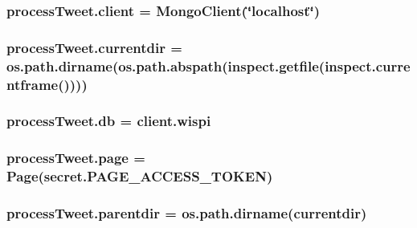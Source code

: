 \subsubsection[{client}]{\setlength{\rightskip}{0pt plus 5cm}process\+Tweet.\+client = Mongo\+Client(\char`\"{}localhost\char`\"{})}\label{namespaceprocess_tweet_a26fa729e5641a5bb07441b60e9f6a544}
\subsubsection[{currentdir}]{\setlength{\rightskip}{0pt plus 5cm}process\+Tweet.\+currentdir = os.\+path.\+dirname(os.\+path.\+abspath(inspect.\+getfile(inspect.\+currentframe())))}\label{namespaceprocess_tweet_a5b25ebf71d2a3eba39dca9fa5609fd41}
\subsubsection[{db}]{\setlength{\rightskip}{0pt plus 5cm}process\+Tweet.\+db = client.\+wispi}\label{namespaceprocess_tweet_a2644e897704f3c17744a00724c80b86b}
\subsubsection[{page}]{\setlength{\rightskip}{0pt plus 5cm}process\+Tweet.\+page = Page(secret.\+P\+A\+G\+E\+\_\+\+A\+C\+C\+E\+S\+S\+\_\+\+T\+O\+K\+EN)}\label{namespaceprocess_tweet_a5525e923147fdb949b222d23f1ab87f1}
\subsubsection[{parentdir}]{\setlength{\rightskip}{0pt plus 5cm}process\+Tweet.\+parentdir = os.\+path.\+dirname({\bf currentdir})}\label{namespaceprocess_tweet_af270284ea131ec6e4acf579183138813}
